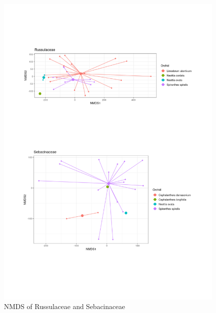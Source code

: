 \begin{figure}[htbp]
\centering
\includegraphics[keepaspectratio,width=\textwidth,height=0.75\textheight]{images/NMDSrusseb.png}
\caption{NMDS of Russulaceae and Sebacinaceae}
\end{figure}

